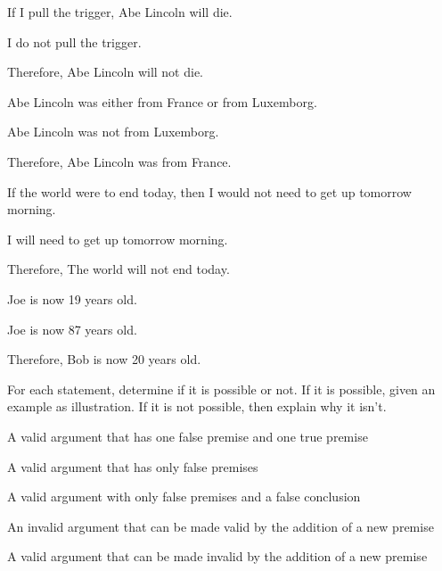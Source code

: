 \begin{earg}
\item If I pull the trigger, Abe Lincoln will die.
\item I do not pull the trigger.
\item Therefore, Abe Lincoln will not die.
\end{earg}

\begin{earg}
\item Abe Lincoln was either from France or from Luxemborg.
\item Abe Lincoln was not from Luxemborg.
\item Therefore, Abe Lincoln was from France.
\end{earg}

\begin{earg}
\item If the world were to end today, then I would not need to get up tomorrow morning.
\item I will need to get up tomorrow morning.
\item Therefore, The world will not end today.
\end{earg}

\begin{earg}
\item Joe is now 19 years old.
\item Joe is now 87 years old.
\item Therefore, Bob is now 20 years old.
\end{earg}

\problempart
\label{pr.EnglishCombinations}
For each statement, determine if it is possible or not. If it is possible, given an example as illustration. If it is not possible, then explain why it isn't.
	\begin{earg}
		\item A valid argument that has one false premise and one true premise
		\item A valid argument that has only false premises
		\item A valid argument with only false premises and a false conclusion
		\item An invalid argument that can be made valid by the addition of a new premise
		\item A valid argument that can be made invalid by the addition of a new premise
	\end{earg}



